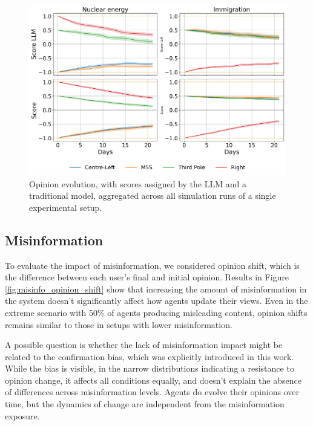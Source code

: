 \begin{figure}[h]
    \centering
    \includegraphics[width=1\linewidth]{Images/Opinions/d21a100m00x_RandomRecSys.png}
    \caption{Opinion evolution, with scores assigned by the LLM and a traditional model, aggregated across all simulation runs of a single experimental setup.}
    \label{fig:opinion_evolution}
\end{figure}


\subsection{Misinformation}
To evaluate the impact of misinformation, we considered opinion shift, which is the difference between each user’s final and initial opinion.
Results in Figure \ref{fig:misinfo_opinion_shift} show that increasing the amount of misinformation in the system doesn’t significantly affect how agents update their views.
Even in the extreme scenario with 50\% of agents producing misleading content, opinion shifts remains similar to those in setups with lower misinformation.

A possible question is whether the lack of misinformation impact might be related to the confirmation bias, which was explicitly introduced in this work.
While the bias is visible, in the narrow distributions indicating a resistance to opinion change, it affects all conditions equally, and doesn't explain the absence of differences across misinformation levels.
Agents do evolve their opinions over time, but the dynamics of change are independent from the misinformation exposure.


